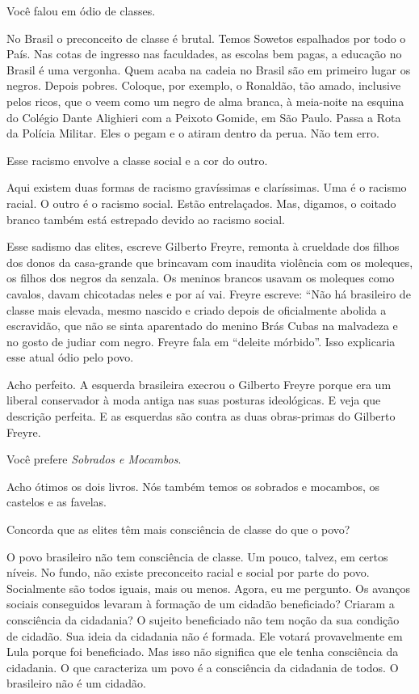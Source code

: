  Você falou em ódio de classes.

 No Brasil o preconceito de classe é brutal. Temos Sowetos espalhados
por todo o País. Nas cotas de ingresso nas faculdades, as escolas bem
pagas, a educação no Brasil é uma vergonha. Quem acaba na cadeia no
Brasil são em primeiro lugar os negros. Depois pobres. Coloque, por
exemplo, o Ronaldão, tão amado, inclusive pelos ricos, que o veem como
um negro de alma branca, à meia-noite na esquina do Colégio Dante
Alighieri com a Peixoto Gomide, em São Paulo. Passa a Rota da Polícia
Militar. Eles o pegam e o atiram dentro da perua. Não tem erro.

 Esse racismo envolve a classe social e a cor do outro.

 Aqui existem duas formas de racismo gravíssimas e claríssimas. Uma é
o racismo racial. O outro é o racismo social. Estão entrelaçados. Mas,
digamos, o coitado branco também está estrepado devido ao racismo
social.

 Esse sadismo das elites, escreve Gilberto Freyre, remonta à crueldade
dos filhos dos donos da casa-grande que brincavam com inaudita violência
com os moleques, os filhos dos negros da senzala. Os meninos brancos
usavam os moleques como cavalos, davam chicotadas neles e por aí vai.
Freyre escreve: ``Não há brasileiro de classe mais elevada, mesmo
nascido e criado depois de oficialmente abolida a escravidão, que não se
sinta aparentado do menino Brás Cubas na malvadeza e no gosto de judiar
com negro. Freyre fala em ``deleite mórbido''. Isso explicaria esse
atual ódio pelo povo.

 Acho perfeito. A esquerda brasileira execrou o Gilberto Freyre porque
era um liberal conservador à moda antiga nas suas posturas ideológicas.
E veja que descrição perfeita. E as esquerdas são contra as duas
obras-primas do Gilberto Freyre.

 Você prefere \emph{Sobrados e Mocambos}.

 Acho ótimos os dois livros. Nós também temos os sobrados e mocambos,
os castelos e as favelas.

 Concorda que as elites têm mais consciência de classe do que o povo?

 O povo brasileiro não tem consciência de classe. Um pouco, talvez, em
certos níveis. No fundo, não existe preconceito racial e social por
parte do povo. Socialmente são todos iguais, mais ou menos. Agora, eu me
pergunto. Os avanços sociais conseguidos levaram à formação de um
cidadão beneficiado? Criaram a consciência da cidadania? O sujeito
beneficiado não tem noção da sua condição de cidadão. Sua ideia da
cidadania não é formada. Ele votará provavelmente em Lula porque foi
beneficiado. Mas isso não significa que ele tenha consciência da
cidadania. O que caracteriza um povo é a consciência da cidadania de
todos. O brasileiro não é um cidadão.


